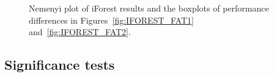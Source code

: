 \documentclass[letter,12pt]{article}
\begin{document}
\begin{figure}[!p]
  \centering
  \hfill
  \caption{Nemenyi plot of iForest results and the boxplots of performance differences in Figures~\ref{fig:IFOREST_FAT1} and~\ref{fig:IFOREST_FAT2}.}
  \label{fig:IFOREST_FAT}
\end{figure}

\subsection{Significance tests}\label{sec:DatRepo1}
\end{document}
